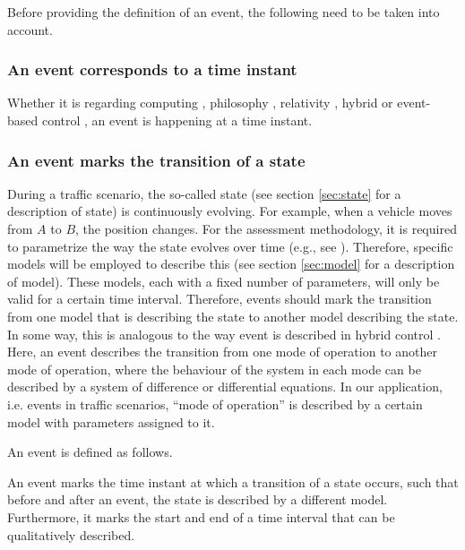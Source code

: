Before providing the definition of an event, the following need to be taken into account.

\subsubsection{An event corresponds to a time instant}
Whether it is regarding computing \cite{breu1997towards}, philosophy \cite{kim1993supervenience}, relativity \cite{sartori1996understanding}, hybrid or event-based control \cite{branicky1998hybridcontrol, deschutter2003hybrid, heemels2012eventcontrol}, an event is happening at a time instant.

\subsubsection{An event marks the transition of a state}
During a traffic scenario, the so-called state (see section \ref{sec:state} for a description of state) is continuously evolving. For example, when a vehicle moves from $A$ to $B$, the position changes. For the assessment methodology, it is required to parametrize the way the state evolves over time (e.g., see \cite{deGelder2017assessment}). Therefore, specific models will be employed to describe this (see section \ref{sec:model} for a description of model). These models, each with a fixed number of parameters, will only be valid for a certain time interval. Therefore, events should mark the transition from one model that is describing the state to another model describing the state. In some way, this is analogous to the way event is described in hybrid control \cite{deschutter2003hybrid}. Here, an event describes the transition from one mode of operation to another mode of operation, where the behaviour of the system in each mode can be described by a system of difference or differential equations. In our application, i.e. events in traffic scenarios, ``mode of operation'' is described by a certain model with parameters assigned to it.

An event is defined as follows.
\begin{definition}[Event]
	An event marks the time instant at which a transition of a state occurs, such that before and after an event, the state is described by a different model. Furthermore, it marks the start and end of a time interval that can be qualitatively described.
\end{definition}
